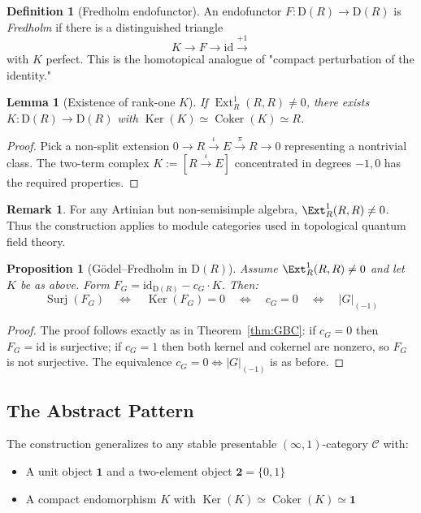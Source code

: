 \documentclass[11pt]{article}
\newtheorem{lemma}[theorem]{Lemma}
\newtheorem{proposition}[theorem]{Proposition}
\theoremstyle{definition}
\newtheorem{definition}[theorem]{Definition}
\newtheorem{remark}[theorem]{Remark}
\newcommand{\bool}{\mathbf{2}}
\DeclareMathOperator{\Ker}{Ker}
\DeclareMathOperator{\Coker}{Coker}
\DeclareMathOperator{\Surj}{Surj}
\newcommand{\trunc}[1]{\lvert #1\rvert_{(-1)}}
\begin{document}
\begin{definition}[Fredholm endofunctor]
An endofunctor $F: \mathrm{D}(R) \to \mathrm{D}(R)$ is \emph{Fredholm} if there is a distinguished triangle
\[
K \to F \to \mathrm{id} \overset{+1}{\to}
\]
with $K$ perfect. This is the homotopical analogue of "compact perturbation of the identity."
\end{definition}

\begin{lemma}[Existence of rank-one $K$]
If $\operatorname{Ext}^1_R(R,R) \neq 0$, there exists $K: \mathrm{D}(R) \to \mathrm{D}(R)$ with $\Ker(K) \simeq \Coker(K) \simeq R$.
\end{lemma}
\begin{proof}
Pick a non-split extension $0 \to R \xrightarrow{\iota} E \xrightarrow{\pi} R \to 0$ representing a nontrivial class. The two-term complex $K := [R \xrightarrow{\iota} E]$ concentrated in degrees $-1,0$ has the required properties.
\end{proof}

\begin{remark}
For any Artinian but non-semisimple algebra, $\Ext^1_R(R,R) \neq 0$. Thus the construction applies to module categories used in topological quantum field theory.
\end{remark}

\begin{proposition}[Gödel--Fredholm in $\mathrm{D}(R)$]
Assume $\Ext^1_R(R,R) \neq 0$ and let $K$ be as above. Form $F_G = \mathrm{id}_{\mathrm{D}(R)} - c_G \cdot K$. Then:
\[
\Surj(F_G) \quad\Longleftrightarrow\quad \Ker(F_G) = 0 \quad\Longleftrightarrow\quad c_G = 0 \quad\Longleftrightarrow\quad \trunc{G}
\]
\end{proposition}
\begin{proof}
The proof follows exactly as in Theorem~\ref{thm:GBC}: if $c_G = 0$ then $F_G = \mathrm{id}$ is surjective; if $c_G = 1$ then both kernel and cokernel are nonzero, so $F_G$ is not surjective. The equivalence $c_G = 0 \iff \trunc{G}$ is as before.
\end{proof}

\subsection{The Abstract Pattern}

The construction generalizes to any stable presentable $(\infty,1)$-category $\mathcal{C}$ with:
\begin{itemize}
\item A unit object $\mathbf{1}$ and a two-element object $\bool = \{0,1\}$
\item A compact endomorphism $K$ with $\Ker(K) \simeq \Coker(K) \simeq \mathbf{1}$
\end{itemize}
\end{document}
